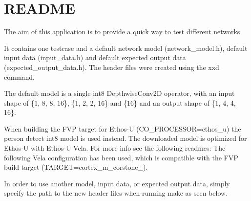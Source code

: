 \chapter{README}
\hypertarget{md__arduino_2_get_started_with_machine_learning_on_arduino_2tflite-micro-main_2tensorflow_2lite_a760299dfa05766269bf057bb302e670}{}\label{md__arduino_2_get_started_with_machine_learning_on_arduino_2tflite-micro-main_2tensorflow_2lite_a760299dfa05766269bf057bb302e670}
The aim of this application is to provide a quick way to test different networks.

It contains one testcase and a default network model (network\+\_\+model.\+h), default input data (input\+\_\+data.\+h) and default expected output data (expected\+\_\+output\+\_\+data.\+h). The header files were created using the {\ttfamily xxd} command.

The default model is a single int8 Depthwise\+Conv2D operator, with an input shape of \{1, 8, 8, 16\}, \{1, 2, 2, 16\} and \{16\} and an output shape of \{1, 4, 4, 16\}.

When building the FVP target for Ethos-\/U (CO\+\_\+\+PROCESSOR=ethos\+\_\+u) the person detect int8 model is used instead. The downloaded model is optimized for Ethos-\/U with Ethos-\/U Vela. For more info see the following readmes\+:    The following Vela configuration has been used, which is compatible with the FVP build target (TARGET=cortex\+\_\+m\+\_\+corstone\+\_).


\begin{DoxyCode}{0}

\end{DoxyCode}


In order to use another model, input data, or expected output data, simply specify the path to the new header files when running make as seen below.

